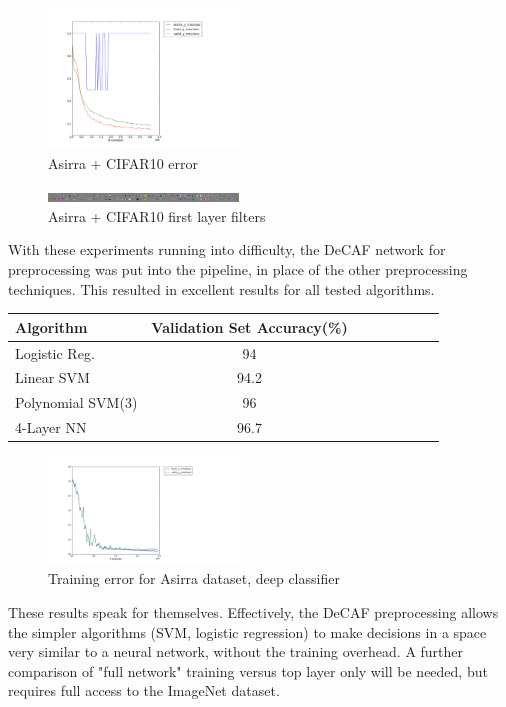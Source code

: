 \documentclass[journal]{IEEEtran}
\begin{document}
\begin{figure}[h!]
\centering
  \includegraphics[width=0.45\textwidth]{asirratrain.png}
  \caption{Asirra + CIFAR10 error}
\label{fig:asirratrain}
\end{figure}

\begin{figure}[h!]
\centering
  \includegraphics[width=0.45\textwidth]{asirraweights.png}
  \caption{Asirra + CIFAR10 first layer filters}
\label{fig:asirraweights}
\end{figure}

With these experiments running into difficulty, the DeCAF network for
preprocessing was put into the pipeline, in place of the other preprocessing 
techniques. This resulted in excellent results for all tested algorithms.

\begin{tabular}{l*{6}{c}r}
    Algorithm         & Validation Set Accuracy(\%) \\
    \hline
    Logistic Reg.     & 94   \\
    Linear SVM        & 94.2 \\
    Polynomial SVM(3) & 96   \\
    4-Layer NN        & 96.7 \\
\end{tabular}

\begin{figure}[h!]
\centering
  \includegraphics[width=0.45\textwidth]{asirra.png}
  \caption{Training error for Asirra dataset, deep classifier}
\label{fig:asirra}
\end{figure}
These results speak for themselves. Effectively, the DeCAF preprocessing allows
the simpler algorithms (SVM, logistic regression) to make decisions in a space
very similar to a neural network, without the training overhead. A further
comparison of "full network" training versus top layer only will be needed, but
requires full access to the ImageNet dataset.
\end{document}
